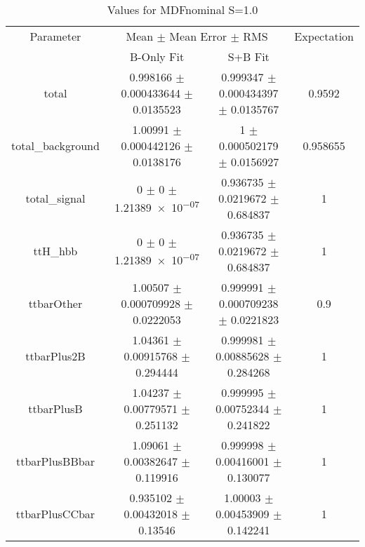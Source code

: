 \begin{table}
\centering
\caption{Values for MDFnominal S=1.0}
\begin{tabular}{cccc}
\toprule
Parameter & \multicolumn{2}{c}{Mean $\pm$ Mean Error $\pm$ RMS} & Expectation\\
 & B-Only Fit & S+B Fit & \\
\midrule
total & \num{0.998166} $\pm$ \num{0.000433644} $\pm$ \num{0.0135523} & \num{0.999347} $\pm$ \num{0.000434397} $\pm$ \num{0.0135767} & \num{0.9592}\\
total\_background & \num{1.00991} $\pm$ \num{0.000442126} $\pm$ \num{0.0138176} & \num{1} $\pm$ \num{0.000502179} $\pm$ \num{0.0156927} & \num{0.958655}\\
total\_signal & \num{0} $\pm$ \num{0} $\pm$ \num{1.21389e-07} & \num{0.936735} $\pm$ \num{0.0219672} $\pm$ \num{0.684837} & \num{1}\\
ttH\_hbb & \num{0} $\pm$ \num{0} $\pm$ \num{1.21389e-07} & \num{0.936735} $\pm$ \num{0.0219672} $\pm$ \num{0.684837} & \num{1}\\
ttbarOther & \num{1.00507} $\pm$ \num{0.000709928} $\pm$ \num{0.0222053} & \num{0.999991} $\pm$ \num{0.000709238} $\pm$ \num{0.0221823} & \num{0.9}\\
ttbarPlus2B & \num{1.04361} $\pm$ \num{0.00915768} $\pm$ \num{0.294444} & \num{0.999981} $\pm$ \num{0.00885628} $\pm$ \num{0.284268} & \num{1}\\
ttbarPlusB & \num{1.04237} $\pm$ \num{0.00779571} $\pm$ \num{0.251132} & \num{0.999995} $\pm$ \num{0.00752344} $\pm$ \num{0.241822} & \num{1}\\
ttbarPlusBBbar & \num{1.09061} $\pm$ \num{0.00382647} $\pm$ \num{0.119916} & \num{0.999998} $\pm$ \num{0.00416001} $\pm$ \num{0.130077} & \num{1}\\
ttbarPlusCCbar & \num{0.935102} $\pm$ \num{0.00432018} $\pm$ \num{0.13546} & \num{1.00003} $\pm$ \num{0.00453909} $\pm$ \num{0.142241} & \num{1}\\
\bottomrule
\end{tabular}
\end{table}